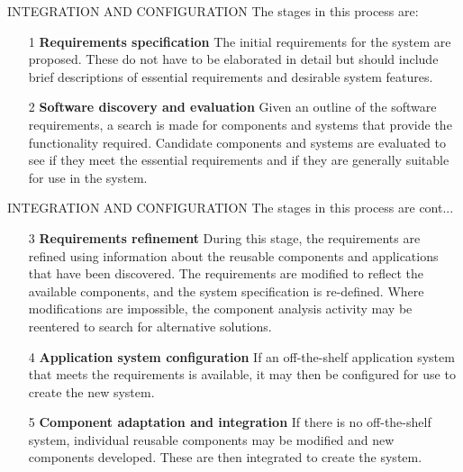\documentclass{beamer}
\begin{document}
\begin{frame}{INTEGRATION AND CONFIGURATION}
	The stages in this process are:
	\begin{itemize}
		\item[1] \textbf{Requirements specification} The initial requirements for the system are proposed. These do not have to be elaborated in detail but should include brief descriptions of essential requirements and desirable system features.
		\item[2] \textbf{Software discovery and evaluation} Given an outline of the software requirements, a search is made for components and systems that provide the functionality required. Candidate components and systems are evaluated to see if they meet the essential requirements and if they are generally suitable for use in the system.
			
	\end{itemize}
\end{frame}
\begin{frame}{INTEGRATION AND CONFIGURATION}
	The stages in this process are cont...
	\begin{itemize}
		\item[3] \textbf{Requirements refinement} During this stage, the requirements are refined using information about the reusable components and applications that have been discovered. The requirements are modified to reflect the available components, and the system specification is re-defined. Where modifications are impossible, the component analysis activity may be reentered to search for
			alternative solutions.
			
		\item[4] \textbf{Application system configuration} If an off-the-shelf application system that meets the requirements is available, it may then be configured for use to create the new system.
			
			\item[5] \textbf{Component adaptation and integration} If there is no off-the-shelf system, individual reusable components may be modified and new components developed. These are then integrated to create the system.
	\end{itemize}
\end{frame}
\end{document}

